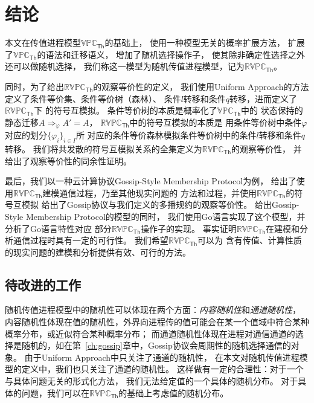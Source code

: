 \chapter{结论}

本文在传值进程模型$\mathbb{VPC}_{\mathsf{Th}}$的基础上，
使用一种模型无关的概率扩展方法，
扩展了$\mathbb{VPC}_{\mathsf{Th}}$的语法和迁移语义，
增加了随机选择操作子，
使其除非确定性选择之外还可以做随机选择，
我们称这一模型为随机传值进程模型，记为$\mathbb{RVPC}_{\mathsf{Th}}$。

同时，为了给出$\mathbb{RVPC}_{\mathsf{Th}}$的观察等价性的定义，
我们使用Uniform Approach的方法定义了条件等价集、条件等价树（森林）、
条件$l$转移和条件$q$转移，进而定义了$\mathbb{RVPC}_{\mathsf{Th}}$下
的符号互模拟。
条件等价树的本质是概率化了$\mathbb{VPC}_{\mathsf{Th}}$中的
状态保持的静态迁移$A\Rightarrow_{\varphi}A'=A$，
$\mathbb{RVPC}_{\mathsf{Th}}$中的符号互模拟的本质是
用条件等价树中条件$\varphi$对应的划分$\{\varphi_i\}_{i\in I}$所
对应的条件等价森林模拟条件等价树中的条件$l$转移和条件$q$转移。
我们将共发散的符号互模拟关系的全集定义为$\mathbb{RVPC}_{\mathsf{Th}}$的观察等价性，
并给出了观察等价性的同余性证明。

最后，我们以一种云计算协议Gossip-Style Membership Protocol为例，
给出了使用$\mathbb{RVPC}_{\mathsf{Th}}$建模通信过程，乃至其他现实问题的
方法和过程，并使用$\mathbb{RVPC}_{\mathsf{Th}}$的符号互模拟
给出了Gossip协议与我们定义的多播规约的观察等价性。
给出Gossip-Style Membership Protocol的模型的同时，
我们使用Go语言实现了这个模型，并分析了Go语言特性对应
部分$\mathbb{RVPC}_{\mathsf{Th}}$操作子的实现。
事实证明$\mathbb{RVPC}_{\mathsf{Th}}$在建模和分析通信过程时具有一定的可行性。
我们希望$\mathbb{RVPC}_{\mathsf{Th}}$可以为
含有传值、计算性质的现实问题的建模和分析提供有效、可行的方法。

\section{待改进的工作}
随机传值进程模型中的随机性可以体现在两个方面：\textit{内容随机性}和\textit{通道随机性}，
内容随机性体现在值的随机性，外界向进程传的值可能会在某一个值域中符合某种概率分布，或近似符合某种概率分布；
而通道随机性体现在进程对通信通道的选择是随机的，如在第~\ref{ch:gossip}章中，Gossip协议会周期性的随机选择通信的对象。
由于Uniform Approach中只关注了通道的随机性，
在本文对随机传值进程模型的定义中，我们也只关注了通道的随机性。
这样做有一定的合理性：对于一个与具体问题无关的形式化方法，
我们无法给定值的一个具体的随机分布。
对于具体的问题，我们可以在$\mathbb{RVPC}_{\mathsf{Th}}$的基础上考虑值的随机分布。

